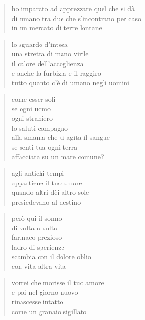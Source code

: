 	\begin{verse}
		ho imparato ad apprezzare quel che si dà\\
		di umano tra due che s’incontrano per caso\\
		in un mercato di terre lontane
	\end{verse}

	\begin{verse}
		lo sguardo d’intesa\\
		una stretta di mano virile\\
		il calore dell’accoglienza\\
		e anche la furbizia e il raggiro\\
		tutto quanto c’è di umano negli uomini
	\end{verse}

	\begin{verse}
		come esser soli\\
		se ogni uomo\\
		ogni straniero\\
		lo saluti compagno\\
		alla smania che ti agita il sangue\\
		se senti tua ogni terra\\
		affacciata su un mare comune?
	\end{verse}

\clearpage



	\begin{verse}
                agli antichi tempi\\
                appartiene il tuo amore\\
                quando altri dèi altro sole\\
                presiedevano al destino
	\end{verse}

	\begin{verse}
                però qui il sonno\\
                di volta a volta\\
                farmaco prezioso\\
                ladro di sperienze\\
                scambia con il dolore oblio\\
                con vita altra vita
	\end{verse}

	\begin{verse}
                vorrei che morisse il tuo amore\\
                e poi nel giorno nuovo\\
                rinascesse intatto\\
                come un granaio sigillato
	\end{verse}

